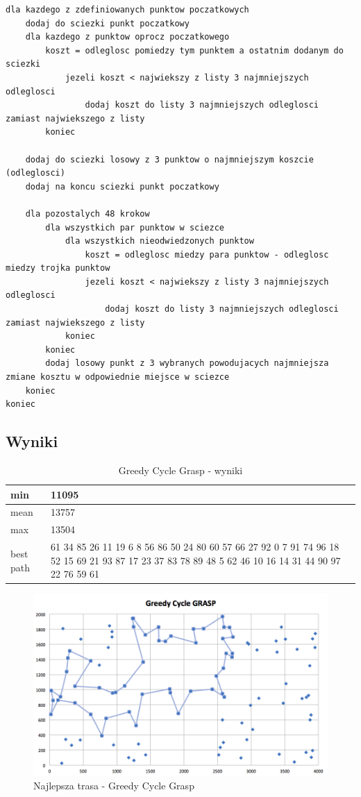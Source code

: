 \documentclass[a4paper 10pt]{article}
\begin{document}
\begin{lstlisting}[frame=single]
dla kazdego z zdefiniowanych punktow poczatkowych
	dodaj do sciezki punkt poczatkowy
	dla kazdego z punktow oprocz poczatkowego
		koszt = odleglosc pomiedzy tym punktem a ostatnim dodanym do sciezki
			jezeli koszt < najwiekszy z listy 3 najmniejszych odleglosci
				dodaj koszt do listy 3 najmniejszych odleglosci zamiast najwiekszego z listy
		koniec
	
	dodaj do sciezki losowy z 3 punktow o najmniejszym koszcie (odleglosci)
	dodaj na koncu sciezki punkt poczatkowy
	
	dla pozostalych 48 krokow
		dla wszystkich par punktow w sciezce
			dla wszystkich nieodwiedzonych punktow
				koszt = odleglosc miedzy para punktow - odleglosc miedzy trojka punktow
				jezeli koszt < najwiekszy z listy 3 najmniejszych odleglosci
					dodaj koszt do listy 3 najmniejszych odleglosci zamiast najwiekszego z listy
			koniec
		koniec
		dodaj losowy punkt z 3 wybranych powodujacych najmniejsza zmiane kosztu w odpowiednie miejsce w sciezce
	koniec	
koniec

\end{lstlisting}
\subsection{Wyniki}

\begin{table}[H]
\center
\caption{Greedy Cycle Grasp - wyniki}
\label{Greedy Cycle Grasp- wyniki}
\begin{tabular}{|p{1cm}|p{14cm}|}
\hline
min       &  11095 \\ \hline
mean      &  13757 \\ \hline
max       &  13504 \\ \hline
best path &  61
34
85
26
11
19
6 
8 
56
86
50
24
80
60
57
66
27
92
0 
7 
91
74
96
18
52
15
69
21
93
87
17
23
37
83
78
89
48
5 
62
46
10
16
14
31
44
90
97
22
76
59
61\\ \hline
\end{tabular}
\end{table}

\begin{figure} [H]
\centering
\includegraphics[angle=0,width = 1\textwidth, height=!]{images/GCG.png}
\caption{Najlepsza trasa - Greedy Cycle Grasp}
\label{Rys. GGC}
\end{figure}
\end{document}
